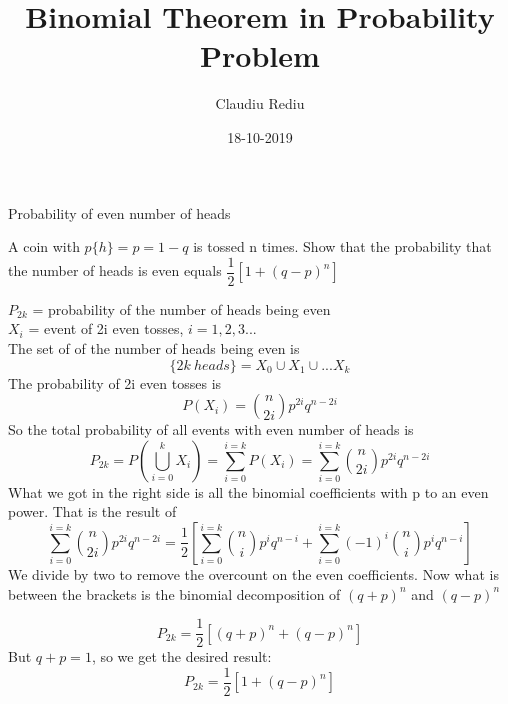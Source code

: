\documentclass[12pt, a4paper]{problemClass}
\title{{\myfont Binomial Theorem in Probability Problem}}
\date{18-10-2019}
\author{Claudiu Rediu}
\begin{document}
	\maketitle
	\newpage
	\newpage
	
	\solutiontrue  %
	
		\begin{problem}{Probability of even number of heads}
			
			A coin with $p\{h\} = p = 1 - q$ is tossed n times. Show that the probability that the number of heads is even equals $\dfrac{1}{2}[1 + (q-p)^n]$
			
			
			\begin{solution}
				$P_{2k}$ = probability of the number of heads being even \\
				$X_{i}$ = event of 2i even tosses, $i = 1,2,3...$ \\
				The set of of the number of heads being even is
			\begin{equation}
			\{2k\ heads\} = X_{0} \cup X_{1} \cup ... X_{k}
			\end{equation}
				The probability of 2i even tosses is
			\begin{equation}
			P(X_{i}) = \binom{n}{2i}p^{2i}q^{n-2i}
			\end{equation}
				So the total probability of all events with even number of heads is
			\begin{equation}
			P_{2k} = P(\bigcup\limits_{i=0}^{k} X_{i}) = \sum_{i=0}^{i=k}P(X_{i}) = \sum_{i=0}^{i=k}\binom{n}{2i}p^{2i}q^{n-2i}
			\end{equation}
				What we got in the right side is all the binomial coefficients with p to an even power. That is the result of
			\begin{equation}
			\sum_{i=0}^{i=k}\binom{n}{2i}p^{2i}q^{n-2i} = \dfrac{1}{2}[ \sum_{i=0}^{i=k}\binom{n}{i}p^{i}q^{n-i} + \sum_{i=0}^{i=k}(-1)^{i}\binom{n}{i}p^{i}q^{n-i}]
			\end{equation}
				We divide by two to remove the overcount on the even coefficients. Now what is between the brackets is the binomial decomposition of $(q+p)^n$ and $(q-p)^n$
				
			\begin{equation}
			P_{2k} = \dfrac{1}{2}[(q+p)^n + (q-p)^n]
			\end{equation}
				But $q+p = 1$, so we get the desired result:
			\begin{equation}
			P_{2k} = \dfrac{1}{2}[1 + (q-p)^n]
			\end{equation}
				
			\end{solution}
		\end{problem}

	
\end{document}
